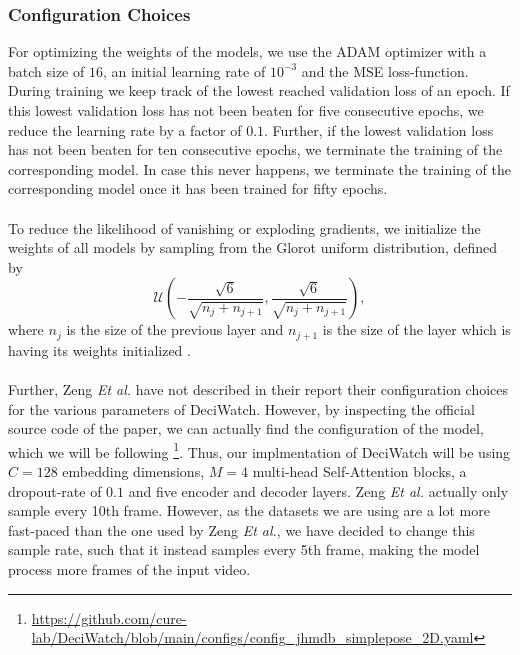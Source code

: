 \documentclass[./main.tex]{subfiles}
\begin{document}
\subsubsection{Configuration Choices} 
For optimizing the weights of the models, we use the ADAM optimizer with a batch size of $16$, an initial learning rate of $10^{-3}$ and the MSE loss-function. During training we keep track of the lowest reached validation loss of an epoch. If this lowest validation loss has not been beaten for five consecutive epochs, we reduce the learning rate by a factor of $0.1$. Further, if the lowest validation loss has not been beaten for ten consecutive epochs, we terminate the training of the corresponding model. In case this never happens, we terminate the training of the corresponding model once it has been trained for fifty epochs.
\\
\\
To reduce the likelihood of vanishing or exploding gradients, we initialize the weights of all models by sampling from the Glorot uniform distribution, defined by
\begin{equation}
    \mathcal{U} \left(- \frac{\sqrt{6}}{\sqrt{n_j + n_{j + 1}}}, \frac{\sqrt{6}}{\sqrt{n_j + n_{j + 1}}} \right),
\end{equation}
where $n_j$ is the size of the previous layer and $n_{j + 1}$ is the size of the layer which is having its weights initialized \cite{glorot2010understanding}.
\\
\\
Further, Zeng \textit{Et al.} \cite{https://doi.org/10.48550/arxiv.2203.08713} have not described in their report their configuration choices for the various parameters of DeciWatch. However, by inspecting the official source code of the paper, we can actually find the configuration of the model, which we will be following \footnote{\url{https://github.com/cure-lab/DeciWatch/blob/main/configs/config_jhmdb_simplepose_2D.yaml}}. Thus, our implmentation of DeciWatch will be using $C = 128$ embedding dimensions, $M = 4$ multi-head Self-Attention blocks, a dropout-rate of $0.1$ and five encoder and decoder layers. Zeng \textit{Et al.} actually only sample every 10th frame. However, as the datasets we are using are a lot more fast-paced than the one used by Zeng \textit{Et al.}, we have decided to change this sample rate, such that it instead samples every 5th frame, making the model process more frames of the input video.
\end{document}

